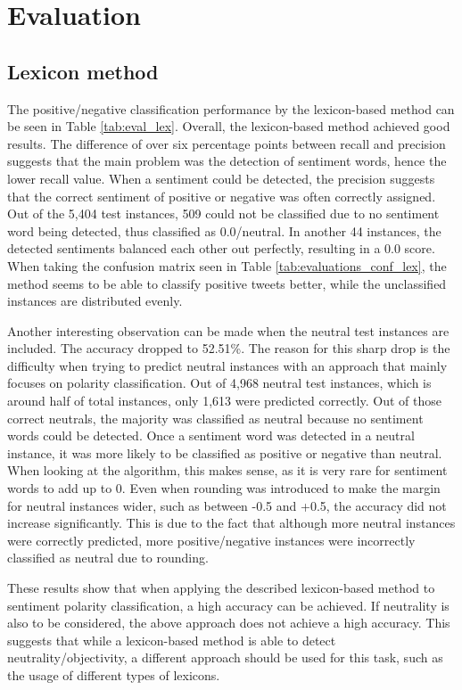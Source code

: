 \chapter{Evaluation}
\section{Lexicon method}

The positive/negative classification performance by the lexicon-based method can be seen in Table \ref{tab:eval_lex}. Overall, the lexicon-based method achieved good results. The difference of over six percentage points between recall and precision suggests that the main problem was the detection of sentiment words, hence the lower recall value. When a sentiment could be detected, the precision suggests that the correct sentiment of positive or negative was often correctly assigned. Out of the 5,404 test instances, 509 could not be classified due to no sentiment word being detected, thus classified as 0.0/neutral. In another 44 instances, the detected sentiments balanced each other out perfectly, resulting in a 0.0 score. When taking the confusion matrix seen in Table \ref{tab:evaluations_conf_lex}, the method seems to be able to classify positive tweets better, while the unclassified instances are distributed evenly. 

Another interesting observation can be made when the neutral test instances are included. The accuracy dropped to 52.51\%. The reason for this sharp drop is the difficulty when trying to predict neutral instances with an approach that mainly focuses on polarity classification. Out of 4,968 neutral test instances, which is around half of total instances, only 1,613 were predicted correctly. Out of those correct neutrals, the majority was classified as neutral because no sentiment words could be detected. Once a sentiment word was detected in a neutral instance, it was more likely to be classified as positive or negative than neutral. When looking at the algorithm, this makes sense, as it is very rare for sentiment words to add up to 0. Even when rounding was introduced to make the margin for neutral instances wider, such as between -0.5 and +0.5, the accuracy did not increase significantly. This is due to the fact that although more neutral instances were correctly predicted, more positive/negative instances were incorrectly classified as neutral due to rounding.

These results show that when applying the described lexicon-based method to sentiment polarity classification, a high accuracy can be achieved. If neutrality is also to be considered, the above approach does not achieve a high accuracy. This suggests that while a lexicon-based method is able to detect neutrality/objectivity, a different approach should be used for this task, such as the usage of different types of lexicons.

